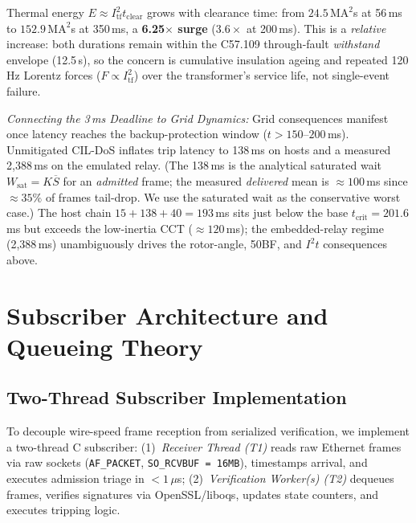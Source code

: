 \documentclass[journal]{IEEEtran}
\begin{document}
Thermal energy $E\approx I_{\text{tf}}^2 t_{\text{clear}}$ grows with clearance time: from $24.5\,\text{MA}^2$s at 56\,ms to $152.9\,\text{MA}^2$s at 350\,ms, a \textbf{6.25$\times$ surge} ($3.6\times$ at 200\,ms). This is a \emph{relative} increase: both durations remain within the C57.109 through-fault \emph{withstand} envelope (12.5\,s), so the concern is cumulative insulation ageing and repeated 120\,Hz Lorentz forces ($F\propto I_{\text{tf}}^2$) over the transformer's service life, not single-event failure.

\textit{Connecting the 3\,ms Deadline to Grid Dynamics:} Grid consequences manifest once latency reaches the backup-protection window ($t>150$--$200$\,ms). Unmitigated CIL-DoS inflates trip latency to 138\,ms on hosts and a measured 2,388\,ms on the emulated relay. (The 138\,ms is the analytical saturated wait $W_{\text{sat}}=K\overline{S}$ for an \emph{admitted} frame; the measured \emph{delivered} mean is $\approx 100$\,ms since $\approx 35\%$ of frames tail-drop. We use the saturated wait as the conservative worst case.) The host chain $15+138+40=193$\,ms sits just below the base $t_{\text{crit}}=201.6$\,ms but exceeds the low-inertia CCT ($\approx 120$\,ms); the embedded-relay regime (2,388\,ms) unambiguously drives the rotor-angle, 50BF, and $I^2t$ consequences above.

\section{Subscriber Architecture and Queueing Theory}
\label{sec:architecture_queueing}

\subsection{Two-Thread Subscriber Implementation}
To decouple wire-speed frame reception from serialized verification, we implement a two-thread C subscriber: (1)~\emph{Receiver Thread (T1)} reads raw Ethernet frames via raw sockets (\texttt{AF\_PACKET}, \texttt{SO\_RCVBUF = 16MB}), timestamps arrival, and executes admission triage in $<1\,\mu$s; (2)~\emph{Verification Worker(s) (T2)} dequeues frames, verifies signatures via OpenSSL/liboqs, updates state counters, and executes tripping logic.
\end{document}
